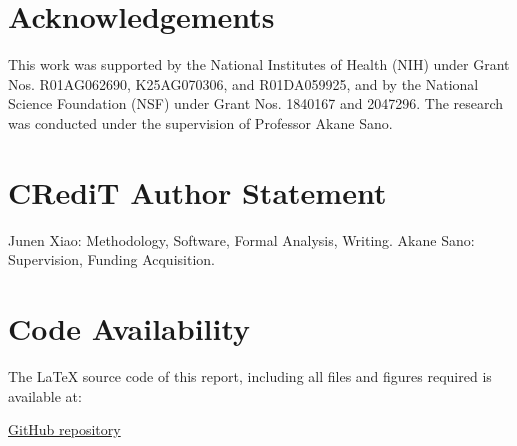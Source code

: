 \documentclass[letterpaper, 10 pt, conference]{ieeeconf}  %
\begin{document}
\section*{Acknowledgements}
This work was supported by the National Institutes of Health (NIH) under Grant Nos. R01AG062690, K25AG070306, and R01DA059925, and by the National Science Foundation (NSF) under Grant Nos. 1840167 and 2047296. The research was conducted under the supervision of Professor Akane Sano.

\section*{CRediT Author Statement}
Junen Xiao: Methodology, Software, Formal Analysis, Writing. Akane Sano: Supervision, Funding Acquisition.

\section*{Code Availability}
The LaTeX source code of this report, including all files and figures required is available at:

\href{https://github.com/PepperJess99/ELEC-594/tree/main/Spring%202026/Midterm%20Report}{GitHub repository}

\addtolength{\textheight}{-12cm}   %







\end{document}
